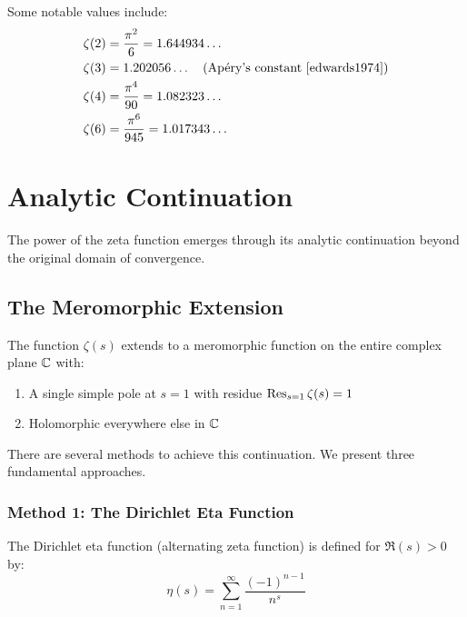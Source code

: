 \begin{example}
Some notable values include:
\begin{align}
\zeta(2) &= \frac{\pi^2}{6} = 1.644934\ldots \\
\zeta(3) &= 1.202056\ldots \quad \text{(Apéry's constant \cite{edwards1974})} \\
\zeta(4) &= \frac{\pi^4}{90} = 1.082323\ldots \\
\zeta(6) &= \frac{\pi^6}{945} = 1.017343\ldots
\end{align}
\end{example}

\section{Analytic Continuation}
\label{sec:analytic_continuation}

The power of the zeta function emerges through its analytic continuation beyond the original domain of convergence.

\subsection{The Meromorphic Extension}

\begin{theorem}
\label{thm:riemann_continuation}
The function $\zeta(s)$ extends to a meromorphic function on the entire complex plane $\mathbb{C}$ with:
\begin{enumerate}[label=(\alph*)]
\item A single simple pole at $s = 1$ with residue $\operatorname{Res}_{s=1} \zeta(s) = 1$
\item Holomorphic everywhere else in $\mathbb{C}$
\end{enumerate}
\end{theorem}

There are several methods to achieve this continuation. We present three fundamental approaches.

\subsubsection{Method 1: The Dirichlet Eta Function}

\begin{definition}
\label{def:eta_function}
The Dirichlet eta function (alternating zeta function) is defined for $\Re(s) > 0$ by:
\begin{equation}
\eta(s) = \sum_{n=1}^{\infty} \frac{(-1)^{n-1}}{n^s}
\label{eq:eta_definition}
\end{equation}
\end{definition}

